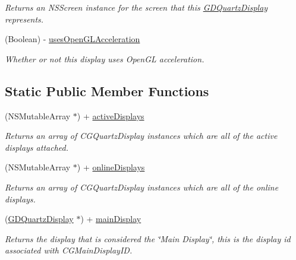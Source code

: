 \begin{DoxyCompactItemize}
\begin{DoxyCompactList}\small\item\em Returns an NSScreen instance for the screen that this \hyperlink{interface_g_d_quartz_display}{GDQuartzDisplay} represents. \item\end{DoxyCompactList}\item 
\hypertarget{interface_g_d_quartz_display_a5b167a92538bb68f5f70281ebb107ee7}{
(Boolean) -\/ \hyperlink{interface_g_d_quartz_display_a5b167a92538bb68f5f70281ebb107ee7}{usesOpenGLAcceleration}}
\label{interface_g_d_quartz_display_a5b167a92538bb68f5f70281ebb107ee7}

\begin{DoxyCompactList}\small\item\em Whether or not this display uses OpenGL acceleration. \item\end{DoxyCompactList}\end{DoxyCompactItemize}
\subsection*{Static Public Member Functions}
\begin{DoxyCompactItemize}
\item 
(NSMutableArray $\ast$) + \hyperlink{interface_g_d_quartz_display_af590fc7b76cf0a54981edd0537919f7b}{activeDisplays}
\begin{DoxyCompactList}\small\item\em Returns an array of CGQuartzDisplay instances which are all of the active displays attached. \item\end{DoxyCompactList}\item 
(NSMutableArray $\ast$) + \hyperlink{interface_g_d_quartz_display_a8ef6d0040c82d777cfaae1f33f4a09fe}{onlineDisplays}
\begin{DoxyCompactList}\small\item\em Returns an array of CGQuartzDisplay instances which are all of the online displays. \item\end{DoxyCompactList}\item 
\hypertarget{interface_g_d_quartz_display_a16f647bc65285d316c90e6e6909641aa}{
(\hyperlink{interface_g_d_quartz_display}{GDQuartzDisplay} $\ast$) + \hyperlink{interface_g_d_quartz_display_a16f647bc65285d316c90e6e6909641aa}{mainDisplay}}
\label{interface_g_d_quartz_display_a16f647bc65285d316c90e6e6909641aa}

\begin{DoxyCompactList}\small\item\em Returns the display that is considered the \char`\"{}Main Display\char`\"{}, this is the display id associated with CGMainDisplayID. \item\end{DoxyCompactList}\end{DoxyCompactItemize}
